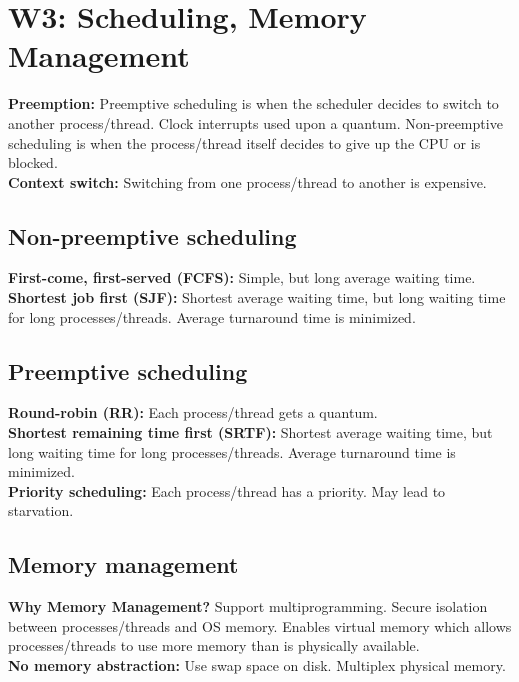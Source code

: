 \section{W3: Scheduling, Memory Management}
\textbf{Preemption:} Preemptive scheduling is when the scheduler decides to switch to another process/thread. Clock interrupts used upon a quantum. Non-preemptive scheduling is when the process/thread itself decides to give up the CPU or is blocked.\\
\textbf{Context switch:} Switching from one process/thread to another is expensive.\\

\subsection{Non-preemptive scheduling}
\textbf{First-come, first-served (FCFS):} Simple, but long average waiting time.\\
\textbf{Shortest job first (SJF):} Shortest average waiting time, but long waiting time for long processes/threads. Average turnaround time is minimized.\\

\subsection{Preemptive scheduling}
\textbf{Round-robin (RR):} Each process/thread gets a quantum.\\
\textbf{Shortest remaining time first (SRTF):} Shortest average waiting time, but long waiting time for long processes/threads. Average turnaround time is minimized.\\
\textbf{Priority scheduling:} Each process/thread has a priority. May lead to starvation.\\

\subsection{Memory management}
\textbf{Why Memory Management?} Support multiprogramming. Secure isolation between processes/threads and OS memory. Enables virtual memory which allows processes/threads to use more memory than is physically available.\\
\textbf{No memory abstraction:} Use swap space on disk. Multiplex physical memory.\\

